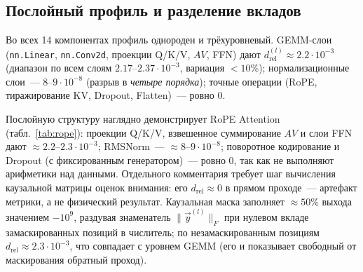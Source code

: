 \subsection{Послойный профиль и разделение вкладов}

Во всех 14 компонентах профиль однороден и трёхуровневый. GEMM-слои
(\texttt{nn.Linear}, \texttt{nn.Conv2d}, проекции Q/K/V, $AV$, FFN) дают
$d_{\text{rel}}^{(l)}\approx2.2\cdot10^{-3}$ (диапазон по всем слоям
$2.17$--$2.37\cdot10^{-3}$, вариация $<10\%$); нормализационные слои~---
$8$--$9\cdot10^{-8}$ (разрыв в \emph{четыре порядка}); точные операции (RoPE,
тиражирование KV, Dropout, Flatten)~--- ровно $0$.

Послойную структуру наглядно демонстрирует RoPE Attention
(табл.~\ref{tab:rope}): проекции Q/K/V, взвешенное суммирование $AV$ и слои
FFN дают ${\approx}2.2$--$2.3\cdot10^{-3}$; RMSNorm~--- ${\approx}8$--$9\cdot10^{-8}$;
поворотное кодирование и Dropout (с фиксированным генератором)~--- ровно $0$, так
как не выполняют арифметики над данными. Отдельного комментария требует шаг
вычисления каузальной матрицы оценок внимания: его $d_{\text{rel}}\approx0$ в
прямом проходе~--- артефакт метрики, а не физический результат. Каузальная маска
заполняет ${\approx}50\%$ выхода значением $-10^9$, раздувая знаменатель
$\|\Vec{y}^{(l)}\|_F$ при нулевом вкладе замаскированных позиций в числитель; по
незамаскированным позициям $d_{\text{rel}}\approx2.3\cdot10^{-3}$, что
совпадает с уровнем GEMM (его и показывает свободный от маскирования обратный
проход).

